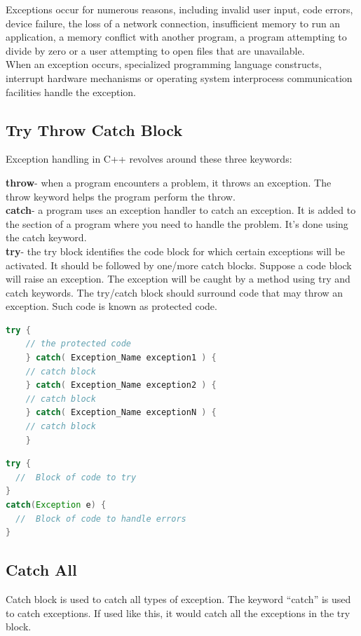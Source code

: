 \documentclass[11pt]{article}
\begin{document}
Exceptions occur for numerous reasons, including invalid user input, code errors, device failure, the loss of a network connection, insufficient memory to run an application, a memory conflict with another program, a program attempting to divide by zero or a user attempting to open files that are unavailable.\\

When an exception occurs, specialized programming language constructs, interrupt hardware mechanisms or operating system interprocess communication facilities handle the exception.\\
\subsection{Try Throw Catch Block}

Exception handling in C++ revolves around these three keywords:

\textbf{throw}- when a program encounters a problem, it throws an exception. The throw keyword helps the program perform the throw.\\

\textbf{catch}- a program uses an exception handler to catch an exception. It is added to the section of a program where you need to handle the problem. It's done using the catch keyword.\\

\textbf{try}- the try block identifies the code block for which certain exceptions will be activated. It should be followed by one/more catch blocks.
Suppose a code block will raise an exception. The exception will be caught by a method using try and catch keywords. The try/catch block should surround code that may throw an exception. Such code is known as protected code.

\begin{lstlisting}[language=C++]
	try {
	// the protected code
	} catch( Exception_Name exception1 ) {
	// catch block
	} catch( Exception_Name exception2 ) {
	// catch block
	} catch( Exception_Name exceptionN ) {
	// catch block
	}
\end{lstlisting}

\begin{lstlisting}[language=Java]
try {
  //  Block of code to try
}
catch(Exception e) {
  //  Block of code to handle errors
}	
\end{lstlisting}

\subsection{Catch All}
Catch block is used to catch all types of exception. The keyword “catch” is used to catch exceptions.
If used like this, it would catch all the exceptions in the try block.
\end{document}
